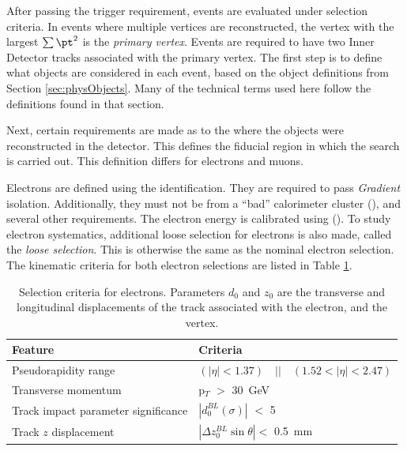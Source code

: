 After passing the trigger requirement, events are evaluated under selection criteria.
In events where multiple vertices are reconstructed, the vertex with the largest $\sum\pt^2$ is the \emph{primary vertex}.
Events are required to have two Inner Detector tracks associated with the primary vertex.
The first step is to define what objects are considered in each event, based on the object definitions from Section \ref{sec:physObjects}.
Many of the technical terms used here follow the definitions found in that section.

Next, certain requirements are made as to the where the objects were reconstructed in the detector. 
This defines the fiducial region in which the search is carried out.
This definition differs for electrons and muons.

Electrons are defined using the  identification.
They are required to pass \emph{Gradient} isolation.
Additionally, they must not be from a ``bad'' calorimeter cluster (), and several other requirements.
The electron energy is calibrated using  ().
To study electron systematics, additional loose selection for electrons is also made, called the \emph{loose selection}.
This is otherwise the same as the nominal electron selection.
The kinematic criteria for both electron selections are listed in Table \ref{tab:ciElectronSel}.

\begin{table}[!htb]
\caption{Selection criteria for electrons. Parameters $d_{0}$ and $z_{0}$ are the transverse and longitudinal displacements of the track associated with the electron, and the vertex.}
\begin{center}
    \begin{tabular}[ht]{l l}
    \toprule
    Feature & Criteria \\
    \midrule
    Pseudorapidity range & $(|\eta| < 1.37) \quad || \quad (1.52 < |\eta| < 2.47)$ \\
    Transverse momentum & p$_T$ $>$ 30~GeV \\
    Track impact parameter significance & $|d_{0}^{BL}(\sigma)|$ $<$ 5 \\
    Track $z$ displacement & $|\Delta z_{0}^{BL} \sin{\theta}| <$ 0.5~mm \\
    \bottomrule
    \end{tabular}
\end{center}
\label{tab:ciElectronSel}
\end{table}

